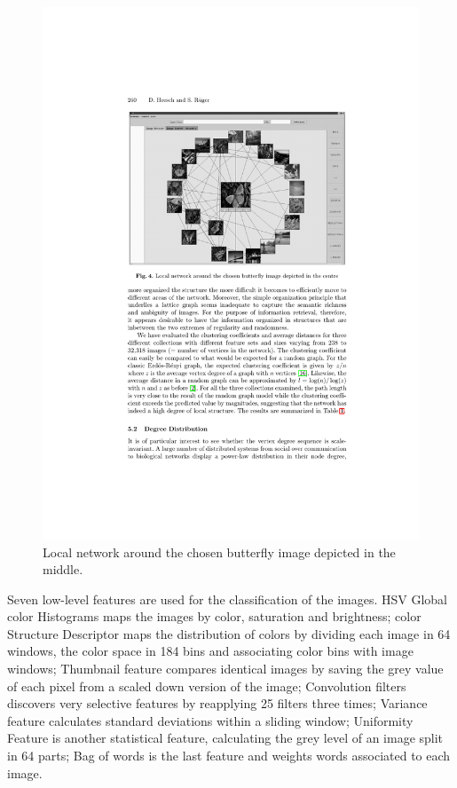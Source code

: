 \begin{figure}[ht]
	\centering
		\includegraphics[scale=1]{imgs-RelatedWork/Heesch-2004p2675}
	\caption{Local network around the chosen butterfly image depicted in the middle.}
	\label{fig:heesch1}
\end{figure}

Seven low-level features are used for the classification of the images. HSV Global color Histograms maps the images by color, saturation and brightness; color Structure Descriptor maps the distribution of colors by dividing each image in 64 windows, the color space in 184 bins and associating color bins with image windows; Thumbnail feature compares identical images by saving the grey value of each pixel from a scaled down version of the image; Convolution filters discovers very selective features by reapplying 25 filters three times; Variance feature calculates standard deviations within a sliding window; Uniformity Feature is another statistical feature, calculating the grey level of an image split in 64 parts; Bag of words is the last feature and weights words associated to each image.

